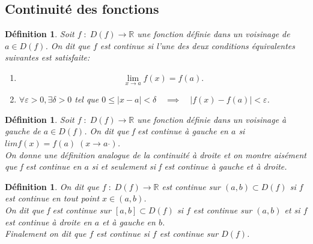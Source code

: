 \documentclass[a4paper, 12pt, french, twoside]{article}
\newtheorem{defi}[theorem]{Définition}
\newcommand{\Rr}{{\mathbb{R}}}
\begin{document}
\subsection{Continuité des fonctions}
\begin{defi}
    Soit $f\;:\;D(f)\longrightarrow\Rr$ une fonction définie dans un voisinage de $a \in D(f)$. 
    On dit que $f$ est continue si l'une des deux conditions équivalentes suivantes est satisfaite:
    \begin{enumerate}
        \item \[\lim_{x\rightarrow a}f(x)=f(a).\]
        \item $\forall \varepsilon>0, \exists \delta>0$ tel que $
        0\leq |x-a|<\delta \quad \implies \quad |f(x)-f(a)|<\varepsilon$.
    \end{enumerate}
\end{defi}
\begin{defi}
    Soit  $f\;:\;D(f)\longrightarrow\Rr$ une fonction définie dans un voisinage à gauche de $a \in D(f)$. On dit que f est continue à gauche en $a$ si $limf(x)=f(a)\;(x\rightarrow a^{\_})$.
\\
    On donne une définition analogue de la continuité à droite et on montre aisément que f est continue en $a$ si et seulement si f est continue à gauche et à droite.
\end{defi}
\begin{defi}
    On dit que  $f\;:\;D(f)\longrightarrow\Rr$ est continue sur $(a,b)\subset D(f)$ si $f$ est continue en tout point $x\in(a,b)$.
\\
    On dit que f est continue sur $[a,b]\subset D(f)$ si $f$ est continue sur $(a,b)$ et si $f$ est continue à droite en $a$ et à gauche en $b$.
\\
    Finalement on dit que $f$ est continue si $f$ est continue sur $D(f)$.
\end{defi}
\end{document}
